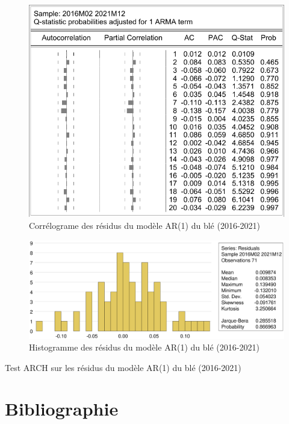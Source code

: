 \documentclass[12pt,a4paper]{article}
\begin{document}
\begin{figure}[H]
    \centering
    \includegraphics[]{annexe/4_3_2_modele_cor.pdf}
    \caption{Corrélograme des résidus du modèle AR(1) du blé (2016-2021)}
\end{figure}

\begin{figure}[H]
    \centering
    \includegraphics[width=\textwidth]{annexe/4_3_2_modele_hist.eps}
    \caption{Histogramme des résidus du modèle AR(1) du blé (2016-2021)}
\end{figure}

\begin{table}[H]
    \centering
    \caption{Test ARCH sur les résidus du modèle AR(1) du blé (2016-2021)}
    \sffamily
    \resizebox{0.6\textwidth}{!}{}
\end{table}
\section*{Bibliographie}
\printbibliography[heading=none]
\clearpage
\tableofcontents
{}
\end{document}
